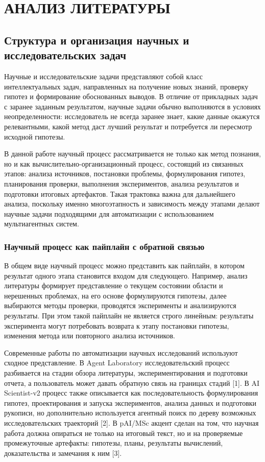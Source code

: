 
\chapter{АНАЛИЗ ЛИТЕРАТУРЫ}

\section{Структура и организация научных и исследовательских задач}

Научные и исследовательские задачи представляют собой класс интеллектуальных задач, направленных на получение новых знаний, проверку гипотез и формирование обоснованных выводов. В отличие от прикладных задач с заранее заданным результатом, научные задачи обычно выполняются в условиях неопределенности: исследователь не всегда заранее знает, какие данные окажутся релевантными, какой метод даст лучший результат и потребуется ли пересмотр исходной гипотезы.

В данной работе научный процесс рассматривается не только как метод познания, но и как вычислительно-организационный процесс, состоящий из связанных этапов: анализа источников, постановки проблемы, формулирования гипотез, планирования проверки, выполнения экспериментов, анализа результатов и подготовки итоговых артефактов. Такая трактовка важна для дальнейшего анализа, поскольку именно многоэтапность и зависимость между этапами делают научные задачи подходящими для автоматизации с использованием мультиагентных систем.

\subsection{Научный процесс как пайплайн с обратной связью}

В общем виде научный процесс можно представить как пайплайн, в котором результат одного этапа становится входом для следующего. Например, анализ литературы формирует представление о текущем состоянии области и нерешенных проблемах, на его основе формулируются гипотезы, далее выбираются методы проверки, проводятся эксперименты и анализируются результаты. При этом такой пайплайн не является строго линейным: результаты эксперимента могут потребовать возврата к этапу постановки гипотезы, изменения метода или повторного анализа источников.

Современные работы по автоматизации научных исследований используют сходное представление. В Agent Laboratory исследовательский процесс разбивается на стадии обзора литературы, экспериментирования и подготовки отчета, а пользователь может давать обратную связь на границах стадий [1]. В AI Scientist-v2 процесс также описывается как последовательность формулирования гипотез, проектирования и запуска экспериментов, анализа данных и подготовки рукописи, но дополнительно используется агентный поиск по дереву возможных исследовательских траекторий [2]. В pAI/MSc акцент сделан на том, что научная работа должна опираться не только на итоговый текст, но и на проверяемые промежуточные артефакты: гипотезы, планы, результаты вычислений, доказательства и замечания к ним [3].

